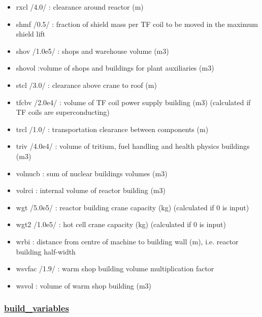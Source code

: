\documentclass[]{article}
\begin{document}
\begin{itemize}
\item
  rxcl /4.0/ : clearance around reactor (m)
\item
  shmf /0.5/ : fraction of shield mass per TF coil to be moved in the
  maximum shield lift
\item
  shov /1.0e5/ : shops and warehouse volume (m3)
\item
  shovol :volume of shops and buildings for plant auxiliaries (m3)
\item
  stcl /3.0/ : clearance above crane to roof (m)
\item
  tfcbv /2.0e4/ : volume of TF coil power supply building (m3)
  (calculated if TF coils are superconducting)
\item
  trcl /1.0/ : transportation clearance between components (m)
\item
  triv /4.0e4/ : volume of tritium, fuel handling and health physics
  buildings (m3)
\item
  volnucb : sum of nuclear buildings volumes (m3)
\item
  volrci : internal volume of reactor building (m3)
\item
  wgt /5.0e5/ : reactor building crane capacity (kg) (calculated if 0 is
  input)
\item
  wgt2 /1.0e5/ : hot cell crane capacity (kg) (calculated if 0 is input)
\item
  wrbi : distance from centre of machine to building wall (m), i.e.
  reactor building half-width
\item
  wsvfac /1.9/ : warm shop building volume multiplication factor
\item
  wsvol : volume of warm shop building (m3)
\end{itemize}

\subsubsection{\href{build_variables.html}{build\_variables}}
\end{document}
